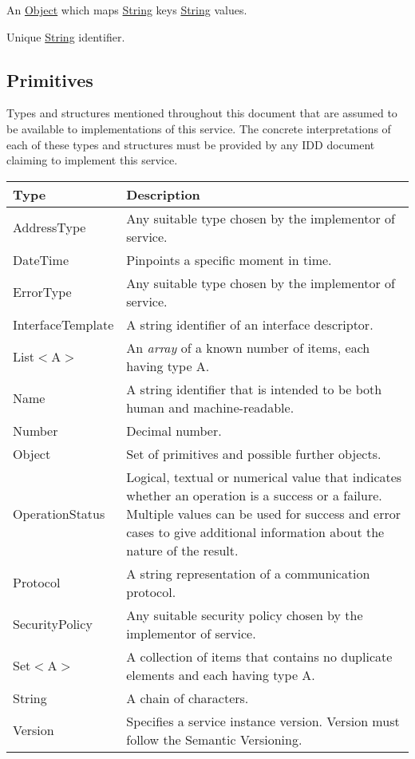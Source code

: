 \documentclass[a4paper]{arrowhead}
\newcommand{\pdef}[1]{{\textcolor{ArrowheadGrey}{#1\label{sec:model:primitives:#1}\label{sec:model:primitives:#1s}\label{sec:model:primitives:#1es}}}}
\newcommand{\pref}[1]{{\textcolor{ArrowheadGrey}{\hyperref[sec:model:primitives:#1]{#1}}}}
\begin{document}

An \pref{Object} which maps \pref{String} keys \pref{String} values.


Unique \pref{String} identifier. 

\subsection{Primitives}
\label{sec:model:primitives}

Types and structures mentioned throughout this document that are assumed to be available to implementations of this service.
The concrete interpretations of each of these types and structures must be provided by any IDD document claiming to implement this service.


\begin{table}[ht!]
\begin{tabularx}{\textwidth}{| p{3cm} | X |} \hline
\rowcolor{gray!33} Type & Description \\ \hline
\pdef{AddressType}      & Any suitable type chosen by the implementor of service. \\ \hline
\pdef{DateTime}         & Pinpoints a specific moment in time. \\ \hline
\pdef{ErrorType}        & Any suitable type chosen by the implementor of service. \\ \hline
\pdef{InterfaceTemplate}& A string identifier of an interface descriptor. \\ \hline
\pdef{List}$<$A$>$      & An \textit{array} of a known number of items, each having type A. \\ \hline
\pdef{Name}             & A string identifier that is intended to be both human and machine-readable. \\ \hline
\pdef{Number}           & Decimal number. \\ \hline
\pdef{Object}           & Set of primitives and possible further objects. \\ \hline
\pdef{OperationStatus}  & Logical, textual or numerical value that indicates whether an operation is a success or a failure. Multiple values can be used for success and error cases to give additional information about the nature of the result. \\ \hline
\pdef{Protocol}         & A string representation of a communication protocol. \\ \hline
\pdef{SecurityPolicy}   & Any suitable security policy chosen by the implementor of service. \\ \hline
\pdef{Set}$<$A$>$       & A collection of items that contains no duplicate elements and each having type A. \\ \hline
\pdef{String}           & A chain of characters. \\ \hline
\pdef{Version}          & Specifies a service instance version. Version must follow the Semantic Versioning.  \\ \hline
\end{tabularx}
\end{table}
\end{document}
